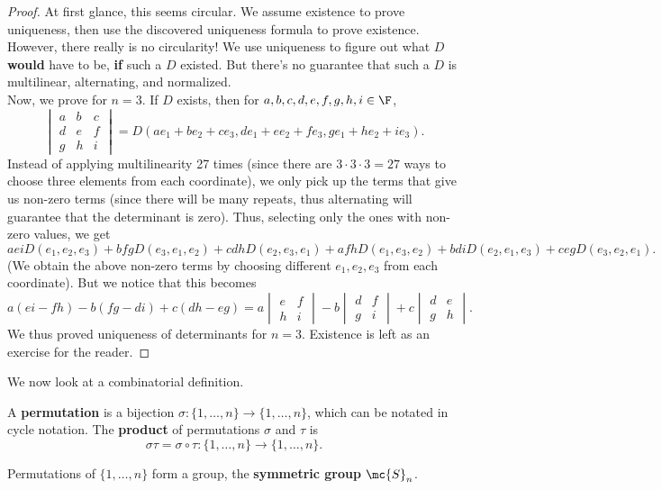 \documentclass[math0540-lecture-notes.tex]{subfiles}
\begin{document}
\begin{proof}[Proof]
    At first glance, this seems circular. We assume existence to prove uniqueness, then use the
    discovered uniqueness formula to prove existence. However, there really is no circularity! We
    use uniqueness to figure out what $D$ \textbf{would} have to be, \textbf{if} such a $D$ existed.
    But there's no guarantee that such a $D$ is multilinear, alternating, and normalized.\\

    Now, we prove for $n=3$. If $D$ exists, then for $a,b,c,d,e,f,g,h,i\in \F$, \[
      \begin{vmatrix} a&b&c\\d&e&f\\g&h&i \end{vmatrix}
      =D(ae_1+be_2+ce_3,de_1+ee_2+fe_3,ge_1+he_2+ie_3)
    .\] Instead of applying multilinearity 27 times (since there are $3\cdot 3\cdot 3=27$ ways to
    choose three elements from each coordinate), we only pick up the terms that give us non-zero
    terms (since there will be many repeats, thus alternating will guarantee that the determinant is
    zero). Thus, selecting only the ones with non-zero values, we get \[
      aeiD(e_1,e_2,e_3)+bfgD(e_3,e_1,e_2)+cdhD(e_2,e_3,e_1)+afhD(e_1,e_3,e_2)+bdiD(e_2,e_1,e_3)+cegD(e_3,e_2,e_1)
    .\] (We obtain the above non-zero terms by choosing different $e_1,e_2,e_3$ from each
    coordinate). But we notice that this becomes \[
      a(ei-fh)-b(fg-di)+c(dh-eg)=a\begin{vmatrix} e&f\\h&i \end{vmatrix} -b\begin{vmatrix} d&f\\g&i
      \end{vmatrix} +c\begin{vmatrix} d&e\\g&h \end{vmatrix} 
    .\] 
    We thus proved uniqueness of determinants for $n=3$. Existence is left as an exercise for the
    reader.
\end{proof}

We now look at a combinatorial definition.
\begin{definition}[Permutations]{}
  A \textbf{permutation} is a bijection $\sigma:\{ 1,\ldots,n \}\to \{ 1,\ldots,n \}$, which can be
  notated in cycle notation. The \textbf{product} of permutations $\sigma$ and $\tau$ is \[
    \sigma\tau=\sigma\circ \tau:\{ 1,\ldots,n \}\to \{ 1,\ldots,n \}
  .\] 
\end{definition}
\begin{remark}
  Permutations of $\{ 1,\ldots,n \}$ form a group, the \textbf{symmetric group} $\mc{S}_n$.
\end{remark}
\end{document}
